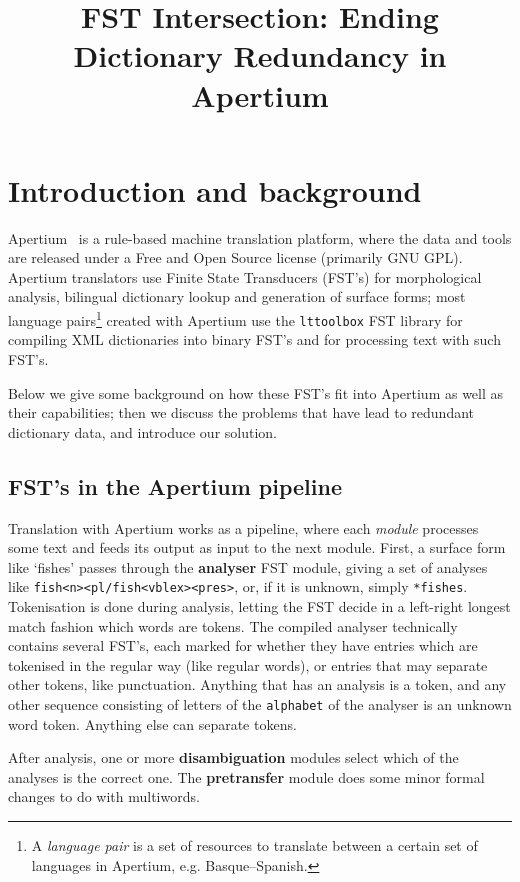 \documentclass[10pt, a4paper]{article}
\title{FST Intersection: Ending Dictionary Redundancy in Apertium} %
\newcommand{\ana}[1]{\texttt{#1}}
\newcommand{\f}[1]{`#1'}
\newcommand{\tool}[1]{\texttt{#1}}
\begin{document}
\maketitleabstract

\section{Introduction and background}

Apertium~\cite{forcada2011afp} is a rule-based machine translation
platform, where the data and tools are released under a Free and Open
Source license (primarily GNU GPL). Apertium translators use Finite
State Transducers (FST's) for morphological analysis, bilingual
dictionary lookup and generation of surface forms; most language
pairs\footnote{A \emph{language pair} is a set of resources to
  translate between a certain set of languages in Apertium, e.g.
  Basque--Spanish.} created with Apertium use the \tool{lttoolbox}
FST library for compiling XML dictionaries into binary FST's and for
processing text with such FST's.

Below we give some background on how these FST's fit into Apertium as
well as their capabilities; then we discuss the problems that have
lead to redundant dictionary data, and introduce our solution.

\subsection{FST's in the Apertium pipeline}
\label{sec:pipeline}

Translation with Apertium works as a pipeline, where each
\emph{module} processes some text and feeds its output as input to the
next module. First, a surface form like \f{fishes} passes through the
\textbf{analyser} FST module, giving a set of analyses like
\ana{fish<n><pl/fish<vblex><pres>}, or, if it is unknown, simply
\ana{*fishes}. Tokenisation is done during analysis, letting the FST
decide in a left-right longest match fashion which words are tokens.
The compiled analyser technically contains several FST's, each marked
for whether they have entries which are tokenised in the regular
way (like regular words), or entries that may separate other tokens,
like punctuation. Anything that has an analysis is a token, and any
other sequence consisting of letters of the \texttt{alphabet} of the
analyser is an unknown word token. Anything else can separate tokens.

After analysis, one or more \textbf{disambiguation} modules select
which of the analyses is the correct one. The \textbf{pretransfer}
module does some minor formal changes to do with multiwords.
\end{document}

